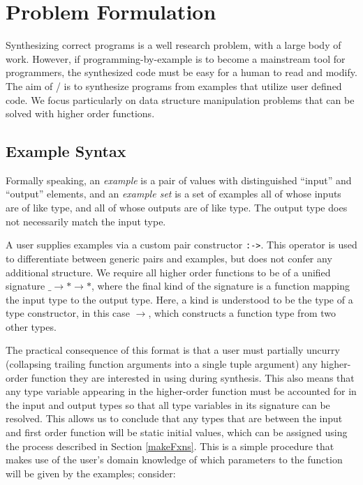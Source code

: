 \section{Problem Formulation} 
\label{problem}


Synthesizing correct programs is a well research problem, with a large body of work\cite{stuff}.
However, if programming-by-example is to become a mainstream tool for programmers, the synthesized code must be easy for a human to read and modify. 
The aim of \ourTool/ is to synthesize programs from examples that utilize user defined code.
We focus particularly on data structure manipulation problems that can be solved with higher order functions.

\subsection{Example Syntax}
Formally speaking, an \textit{example} is a pair of values with distinguished ``input'' and ``output'' elements, and an \textit{example set} is a set of examples all of whose inputs are of like type, and all of whose outputs are of like type. The output type does not necessarily match the input type.

A user supplies examples via a custom pair constructor \texttt{:->}. This operator is used to differentiate between generic pairs and examples, but does not confer any additional structure. We require all higher order functions to be of a unified signature \texttt{$\_ \to * \to *$}, where the final kind of the signature is a function mapping the input type to the output type. Here, a kind is understood to be the type of a type constructor, in this case \texttt{$\to$}, which constructs a function type from two other types.

The practical consequence of this format is that a user must partially uncurry (collapsing trailing function arguments into a single tuple argument) any higher-order function they are interested in using during synthesis.
This also means that any type variable appearing in the higher-order function must be accounted for in the input and output types so that all type variables in its signature can be resolved.
This allows us to conclude that any types that are between the input and first order function will be static initial values, which can be assigned using the process described in Section \ref{makeFxns}.
This is a simple procedure that makes use of the user's domain knowledge of which parameters to the function will be given by the examples; consider:

